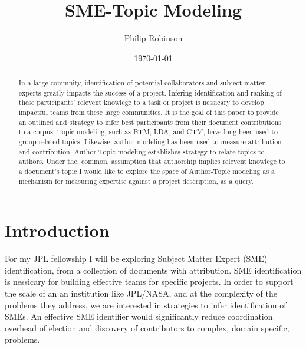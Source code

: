 \documentclass{article}
\title{SME-Topic Modeling}
\date{\today}
\author{Philip Robinson}
\affil{NASA: Jet Propoultion Labratory}
\begin{document}
\maketitle

\begin{abstract}
In a large commnity, identification of potential collaborators and subject matter experts greatly impacts the success of a project. Infering identification and ranking of these participants' relevent knowlege to a task or project is nessicary to develop impactful teams from these large communities\cite{Minto2007}. It is the goal of this paper to provide an outlined and strategy to infer best participants from their document contributions to a corpus. Topic modeling, such as BTM\cite{Yan2013}, LDA, and CTM, have long been used to group related topics\cite{Alghamdi2015}. Likewise, author modeling has been used to measure attribution\cite{Rexha2018} and contribution\cite{AldebeiHJ016}. Author-Topic modeling establishes strategy to relate topics to authors\cite{Rosen-Zvi2004}. Under the, common, assumption that authorship implies relevent knowlege to a document's topic I would like to explore the space of Author-Topic modeling as a mechanism for measuring expertise against a project description, as a query.
\end{abstract}

\section{Introduction}
For my JPL fellowship I will be exploring Subject Matter Expert (SME) identification, from a collection of documents with attribution. SME identification is nessicary for building effective teams for specific projects. In order to support the scale of an an institution like JPL/NASA, and at the complexity of the problems they address, we are interested in strategies to infer identification of SMEs. An effective SME identifier would significantly reduce coordination overhead of election and discovery of contributors to complex, domain specific, problems.
\end{document}
